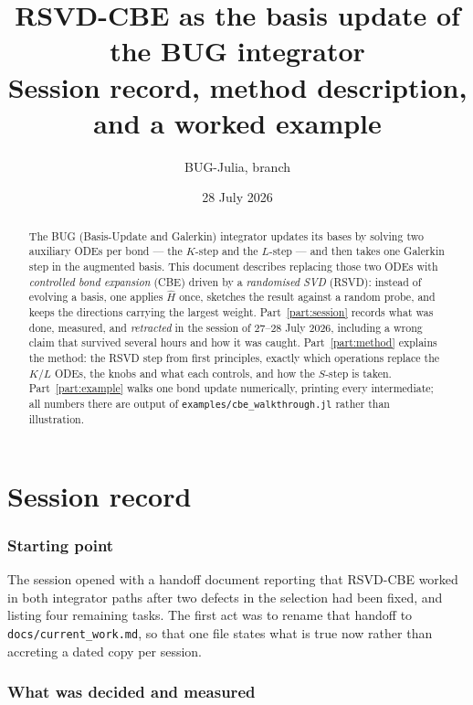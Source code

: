 \documentclass[11pt,a4paper]{article}
\title{\textbf{RSVD-CBE as the basis update of the BUG integrator}\\[2mm]
\large Session record, method description, and a worked example}
\author{BUG-Julia, branch \code{feature/cbe-bug}}
\date{28 July 2026}
\newcommand{\Hb}{\hat{H}}
\newcommand{\file}[1]{\texttt{\small #1}}
\begin{document}
\maketitle

\begin{abstract}
\noindent
The BUG (Basis-Update and Galerkin) integrator updates its bases by solving two auxiliary
ODEs per bond --- the $K$-step and the $L$-step --- and then takes one Galerkin step in the
augmented basis. This document describes replacing those two ODEs with \emph{controlled bond
expansion} (CBE) driven by a \emph{randomised SVD} (RSVD): instead of evolving a basis, one
applies $\Hb$ once, sketches the result against a random probe, and keeps the directions
carrying the largest weight. Part~\ref{part:session} records what was done, measured, and
\emph{retracted} in the session of 27--28 July 2026, including a wrong claim that survived
several hours and how it was caught. Part~\ref{part:method} explains the method: the RSVD
step from first principles, exactly which operations replace the $K$/$L$ ODEs, the knobs and
what each controls, and how the $S$-step is taken. Part~\ref{part:example} walks one bond
update numerically, printing every intermediate; all numbers there are output of
\file{examples/cbe\_walkthrough.jl} rather than illustration.
\end{abstract}

\tableofcontents

\part{Session record}
\label{part:session}

\section{Starting point}

The session opened with a handoff document reporting that RSVD-CBE worked in both integrator
paths after two defects in the selection had been fixed, and listing four remaining tasks. The
first act was to rename that handoff to \file{docs/current\_work.md}, so that one file states
what is true now rather than accreting a dated copy per session.

\section{What was decided and measured}
\end{document}
